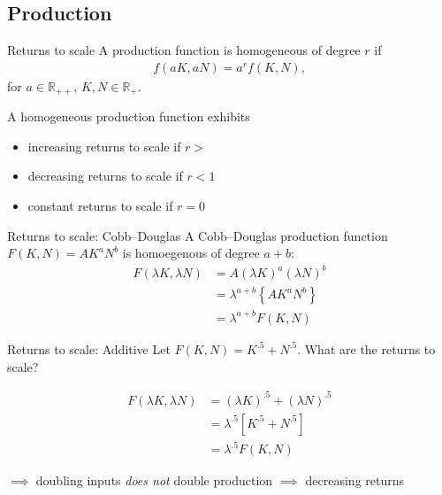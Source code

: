 \documentclass[presentation,dvipsnames]{beamer}
\begin{document}
\subsection{Production}
\begin{frame}[label=sec-2-6]{Returns to scale}
A production function is homogeneous of degree $r$ if
\begin{align*}
f(aK,aN) = a^{r} f(K,N),
\end{align*}
for $a \in \mathbb{R}_{++}$, $K,N \in \mathbb{R}_{+}$.

A homogeneous production function exhibits
\begin{itemize}[label={--}]
\item increasing returns to scale if $r > $
\item decreasing returns to scale if $r < 1$
\item constant returns to scale if $r = 0$
\end{itemize}
\end{frame}

\begin{frame}[label=sec-2-6]{Returns to scale: Cobb--Douglas}
A Cobb--Douglas production function $F(K,N) = AK^{a}N^{b}$ is homoegenous of degree $a + b$:
\begin{align*}
F(\lambda K, \lambda N) &= A \left( \lambda K \right)^{a} \left( \lambda N \right)^{b} \\
&= \lambda^{a+b} \left\{ AK^{a}N^{b} \right\} \\
&= \lambda^{a+b} F(K,N)
\end{align*}
\end{frame}

\begin{frame}[label=sec-2-6]{Returns to scale: Additive}
Let $F(K,N) = K^{.5} + N^{.5}$. What are the returns to scale?

\begin{align*}
F(\lambda K, \lambda N) &= \left( \lambda K \right)^{.5} + \left( \lambda N \right)^{.5} \\
&= \lambda^{.5} \left[ K^{.5} + N^{.5} \right] \\
&= \lambda^{.5} F(K,N)
\end{align*}

$\implies$ doubling inputs \emph{does not} double production $\implies$ decreasing returns
\end{frame}
\end{document}
